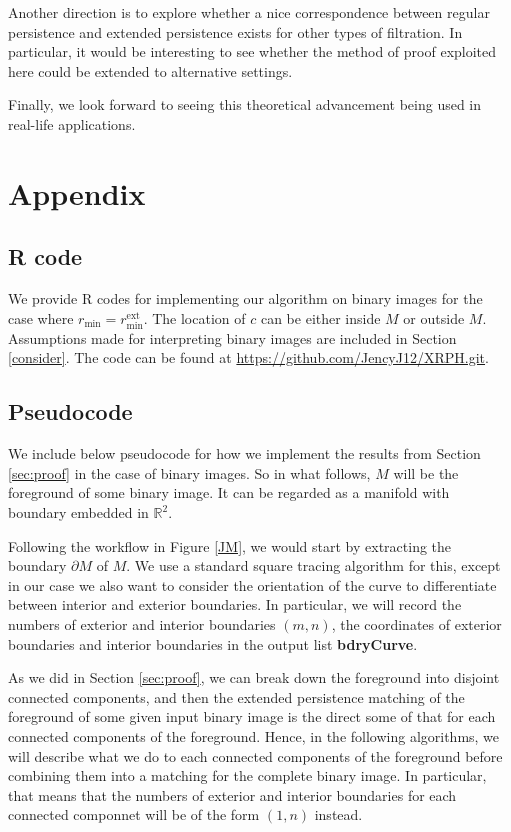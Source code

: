 \documentclass[a4paper,11pt]{article}
\theoremstyle{definition}
\newcommand{\R}{\mathbb{R}}
\begin{document}
Another direction is to explore whether a nice correspondence between regular persistence and extended persistence exists for other types of filtration. In particular, it would be interesting to see whether the method of proof exploited here could be extended to alternative settings. 

Finally, we look forward to seeing this theoretical advancement being used in real-life applications.  



\section{Appendix}
\subsection{R code}
We provide R codes for implementing our algorithm on binary images for the case where $r_{\min}=r_{\min}^{\mathrm{ext}}$. The location of $c$ can be either inside $M$ or outside $M$. Assumptions made for interpreting binary images are included in Section \ref{consider}. The code can be found at \url{https://github.com/JencyJ12/XRPH.git}.

\subsection{Pseudocode}\label{code}
We include below pseudocode for how we implement the results from Section \ref{sec:proof} in the case of binary images. So in what follows, $M$ will be the foreground of some binary image. It can be regarded as a manifold with boundary embedded in $\R^2$. 

Following the workflow in Figure \ref{JM}, we would start by extracting the boundary $\partial M$ of $M$. We use a standard square tracing algorithm for this, except in our case we also want to consider the orientation of the curve to differentiate between interior and exterior boundaries. In particular, we will record the numbers of exterior and interior boundaries $(m,n)$, the coordinates of exterior boundaries and interior boundaries in the output list {\bf bdryCurve}. 

As we did in Section \ref{sec:proof}, we can break down the foreground into disjoint connected components, and then the extended persistence matching of the foreground of some given input binary image is the direct some of that for each connected components of the foreground. Hence, in the following algorithms, we will describe what we do to each connected components of the foreground before combining them into a matching for the complete binary image. In particular, that means that the numbers of exterior and interior boundaries for each connected componnet will be of the form $(1,n)$ instead.
\end{document}
